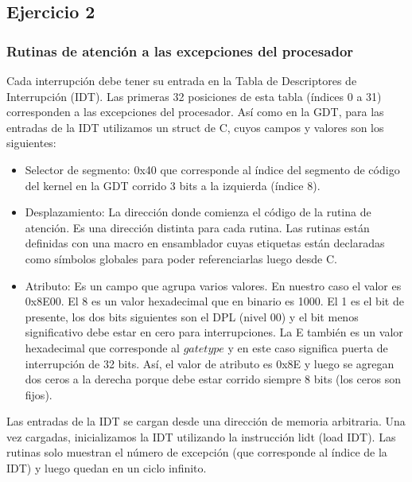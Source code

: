 \subsection{Ejercicio 2}
\subsubsection{Rutinas de atención a las excepciones del procesador}
Cada interrupción debe tener su entrada en la Tabla de Descriptores de Interrupción (IDT). Las primeras 32 posiciones de esta tabla (índices 0 a 31) corresponden a las excepciones del procesador.\newline
Así como en la GDT, para las entradas de la IDT utilizamos un struct de C, cuyos campos y valores son los siguientes:
\begin{itemize}
\item Selector de segmento: 0x40 que corresponde al índice del segmento de código del kernel en la GDT corrido 3 bits a la izquierda (índice 8).
\item Desplazamiento: La dirección donde comienza el código de la rutina de atención. Es una dirección distinta para cada rutina. Las rutinas están definidas con una macro en ensamblador cuyas etiquetas están declaradas como símbolos globales para poder referenciarlas luego desde C.
\item Atributo: Es un campo que agrupa varios valores. En nuestro caso el valor es 0x8E00. El 8 es un valor hexadecimal que en binario es 1000. El 1 es el bit de presente, los dos bits siguientes son el DPL (nivel 00) y el bit menos significativo debe estar en cero para interrupciones. La E también es un valor hexadecimal que corresponde al $gate type$ y en este caso significa puerta de interrupción de 32 bits.  Así, el valor de atributo es 0x8E y luego se agregan dos ceros a la derecha porque debe estar corrido siempre 8 bits (los ceros son fijos).
\end{itemize}
Las entradas de la IDT se cargan desde una dirección de memoria arbitraria. Una vez cargadas, inicializamos la IDT utilizando la instrucción lidt (load IDT).\newline
Las rutinas solo muestran el número de excepción (que corresponde al índice de la IDT) y luego quedan en un ciclo infinito.
